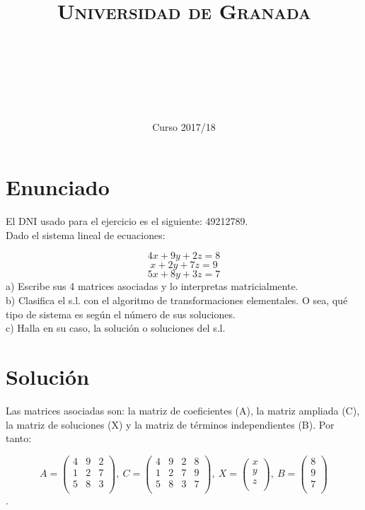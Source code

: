 \documentclass[11pt, a4paper]{article}
\title{
  \normalfont \normalsize 
  \textsc{Universidad de Granada} \\ [25pt]    %
  \horrule{0.5pt} \\[0.4cm] %
  \huge \sffamily\subject\\ %
  \horrule{2pt} \\[0.5cm] %
}
\author{\Large\sffamily{\docauthor}}
\date{\vspace{-1.5em} \normalsize \sffamily Curso 2017/18}
\newif\IfInSansMode
\theoremstyle{theorem-style}
\theoremstyle{definition-style}
\theoremstyle{remark-style}
\theoremstyle{example-style}
\begin{document}
\maketitle  %
\vfill
\begin{center}
\end{center}
\newpage
\tableofcontents    %
\newpage



\section{Enunciado}
El DNI usado para el ejercicio es el siguiente: 49212789. \\

Dado el sistema lineal de ecuaciones:
 

$$ 4x + 9y + 2z = 8$$ 
$$x + 2y + 7z = 9$$ 
$$5x + 8y + 3z = 7$$ 
a) Escribe sus 4 matrices asociadas y lo interpretas matricialmente. \\
b) Clasifica el s.l. con el algoritmo de transformaciones elementales. 
O sea, qué tipo de sistema es según el número de sus soluciones. \\
c) Halla en su caso, la solución o soluciones del s.l.

\section{Solución}

Las matrices asociadas son: la matriz de coeficientes (A), la matriz ampliada (C), la matriz de soluciones (X) y la matriz de términos independientes (B). Por tanto:

$$A = \begin{pmatrix}
4 & 9 & 2 \\
1 & 2 & 7 \\
5 & 8 & 3 \\
\end{pmatrix}, \
C = \begin{pmatrix}
4 & 9 & 2 & 8\\
1 & 2 & 7 & 9\\
5 & 8 & 3 & 7\\
\end{pmatrix}, \
X = \begin{pmatrix}
	x \\
	y \\
	z \\
\end{pmatrix}, \
B = \begin{pmatrix}
8 \\
9 \\
7 \\
\end{pmatrix}$$.
\end{document}
